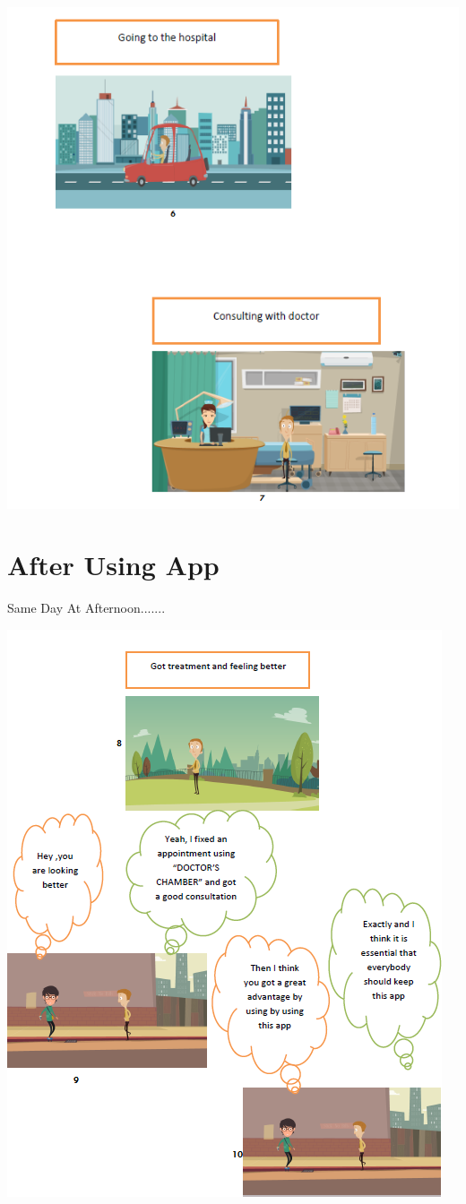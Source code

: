 \documentclass[12pt]{article}
\begin{document}
\includegraphics[scale = 0.99]{AFTER2.PNG}\\[1.0 cm]
\pagebreak
\section*{After Using App}
Same Day At Afternoon.......

\includegraphics[scale = 0.99]{ATRER3.PNG}\\[1.0 cm]
\pagebreak
\end{document}
